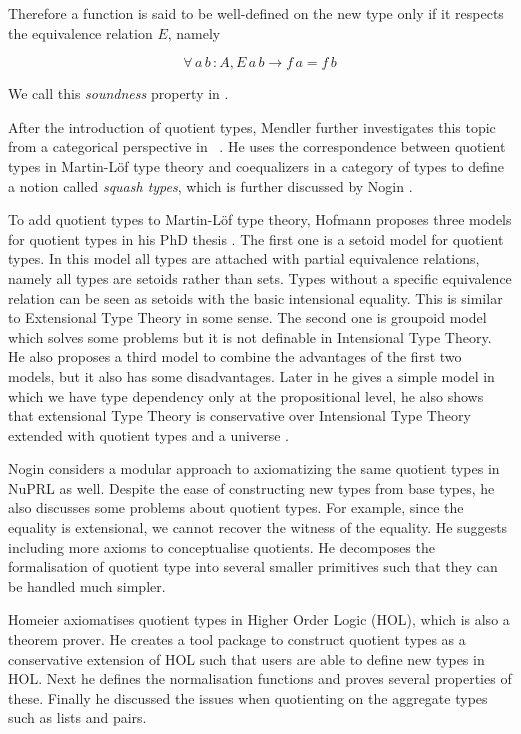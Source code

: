 \documentclass{article}
\theoremstyle{definition}
\newcommand{\itt}{Intensional Type Theory}
\newcommand{\ett}{Extensional Type Theory}
\newcommand{\mltt}{Martin-L\"{o}f type theory}
\begin{document}
Therefore a function is said to be well-defined \cite{cab} on the new type only
if it respects the equivalence relation $E$, namely

$$\forall \, a\,b\,\colon A, E\,a\,b \to f\,a = f\,b$$

We call this \emph{soundness} property in \cite{aan}.

 After the introduction of quotient types, Mendler further investigates
 this topic from a categorical perspective in ~\cite{men:90}. He uses
 the correspondence between quotient types in \mltt{} and coequalizers
 in a category of types to define a notion called \emph{squash types},
 which is further discussed by Nogin \cite{nog:02}.

To add quotient types to \mltt{}, Hofmann proposes  three models for
quotient types in his PhD thesis \cite{hof:phd}. The first one is a setoid model for
quotient types. In this model all types are attached with partial
equivalence relations, namely all types are setoids rather than
sets. Types without a specific equivalence relation can be seen as
setoids with the basic intensional equality. This is similar to
\ett{} in some sense. The second one is groupoid model which solves some problems
but it is not definable in \itt{}. He also proposes a third model to
combine the advantages of the first two models, but it also has some
disadvantages. Later in \cite{hof:95:sm} he gives a simple model in which we have type dependency only at the propositional level, he also shows that extensional Type Theory is conservative over \itt {}  extended with quotient types and a universe \cite{hof:95:con}.

Nogin \cite{nog:02} considers a modular approach to axiomatizing the
same quotient types in NuPRL as well. Despite the ease of constructing new types
from base types, he also discusses some
problems about quotient types. For example, since the equality is
extensional, we cannot recover the
witness of the equality.  He suggests including more axioms to
conceptualise quotients. He decomposes the formalisation of quotient type
into several smaller primitives such that they can be handled much
simpler.

Homeier \cite{hom} axiomatises quotient types in Higher Order Logic
(HOL), which is also a theorem prover. He creates a tool package to
construct quotient types as a conservative extension of HOL such that
users are able to define new types in HOL. Next he defines the
normalisation functions and proves several properties of
these. Finally he discussed the issues when quotienting on the
aggregate types such as lists and pairs.
\end{document}

